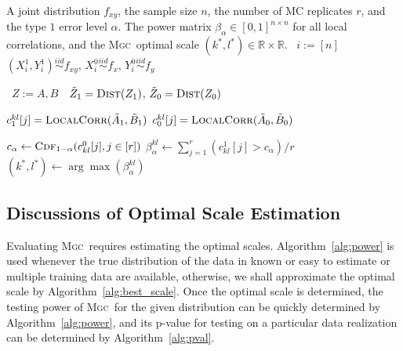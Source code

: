 \documentclass[11pt]{article}
\providecommand{\sct}[1]{{\normalfont\textsc{#1}}}
\newcommand{\Real}{\mathbb{R}}
\newcommand{\G}{c}
\newcommand{\Linefor}[2]{%
    \State \algorithmicfor\ {#1}\ \algorithmicdo\ {#2} \algorithmicend\ \algorithmicfor%
}
\newcommand{\Mgc}{\sct{Mgc}}
\newcommand{\rto}{\leftarrow}
\begin{document}
\begin{algorithm}
\caption{Testing Powers Computation for All Local Correlations: this algorithm computes the testing powers of all local correlations. By repeatedly simulating samples by the joint distribution $f_{xy}$, sample data of size $n$ under the null and the alternative are generated for $r$ Monte-Carlo replicates. Then all sample local correlations under the null and the alternative are computed by Algorithm~\ref{alg:all_scales}, followed by estimating the testing power at each local correlation. The \Mgc~optimal scale can be found by selecting the scale that maximizes power, and it suffices to pick one optimal scale in case of ties. The running time is $O(rn^2 \log n)$. This algorithm can be similarly adapted to training data, for which the alternative statistic can be computed from the training data while the null statistic can be computed by permutation. }
\label{alg:power}
\begin{algorithmic}[1]
\Require A joint distribution $f_{xy}$, the sample size $n$, the number of MC replicates $r$, and the type $1$ error level $\alpha$.
\Ensure The power matrix $\beta_{\alpha} \in [0,1]^{n \times n}$ for all local correlations, and the \Mgc~optimal scale $(k^{*},l^{*}) \in \Real \times \Real$.
\Linefor{$i:=[n]$}{$(X^{1}_{i},Y^{1}_{i}) \stackrel{iid}{\sim} f_{xy}$, $X^{0}_{i} \stackrel{iid}{\sim} f_{x}$, $Y^{0}_{i} \stackrel{iid}{\sim} f_{y}$} 
\Linefor{$Z:=A,B$}{$\tilde{Z}_{1}=\textsc{Dist}(Z_{1})$, $\tilde{Z}_{0}=\textsc{Dist}(Z_{0})$} 
\State $\G^{kl}_{1}[j]=\textsc{LocalCorr}(\tilde{A}_{1},\tilde{B}_{1})$ 
\State $\G^{kl}_{0}[j]=\textsc{LocalCorr}(\tilde{A}_{0},\tilde{B}_{0})$ 
\EndFor

\State $c_{\alpha} \rto \textsc{Cdf}_{1-\alpha}(\G^{0}_{kl}[j],j \in [r])$ 
\State $\beta_{\alpha}^{kl} \rto \sum_{j=1}^{r}(\G^{1}_{kl}[j]>c_{\alpha}) / r$ 
\EndFor
\State $(k^{*},l^{*}) \rto \arg\max(\beta_{\alpha}^{kl})$ 
\EndFunction
\end{algorithmic}
\end{algorithm}

\clearpage
\subsection{Discussions of Optimal Scale Estimation}
\label{appen:diss}
Evaluating \Mgc~requires estimating the optimal scales. Algorithm~\ref{alg:power} is used whenever the true distribution of the data in known or easy to estimate or multiple training data are available, otherwise, we shall approximate the optimal scale by Algorithm~\ref{alg:best_scale}. Once the optimal scale is determined, the testing power of \Mgc~for the given distribution can be quickly determined by Algorithm~\ref{alg:power}, and its p-value for testing on a particular data realization can be determined by Algorithm~\ref{alg:pval}.
\end{document}
